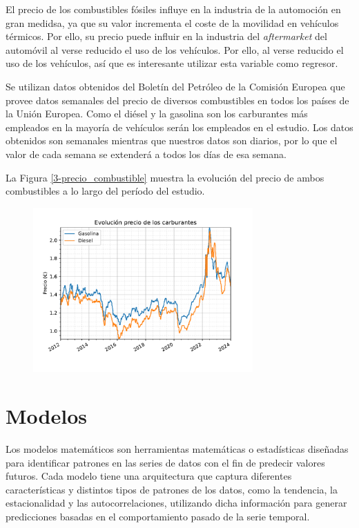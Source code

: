 El precio de los combustibles fósiles influye en la industria de la automoción en gran medidsa, ya que su valor incrementa el coste de la movilidad en vehículos térmicos. Por ello, su precio puede influir en la industria del \textit{aftermarket} del automóvil al verse reducido el uso de los vehículos. Por ello, al verse reducido el uso de los vehículos, así que es interesante utilizar esta variable como regresor.

Se utilizan datos obtenidos del Boletín del Petróleo de la Comisión Europea \cite{petrol} que provee datos semanales del precio de diversos combustibles en todos los países de la Unión Europea. Como el diésel y la gasolina son los carburantes más empleados en la mayoría de vehículos serán los empleados en el estudio. Los datos obtenidos son semanales mientras que nuestros datos son diarios, por lo que el valor de cada semana se extenderá a todos los días de esa semana. 

La Figura \ref*{3-precio_combustible} muestra la evolución del precio de ambos combustibles a lo largo del período del estudio.

\begin{figure}[H]
	{\includegraphics[width=0.75\textwidth]{imagenes/grafica_carburantes.pdf}}
\end{figure}

\section{Modelos}

Los modelos matemáticos son herramientas matemáticas o estadísticas diseñadas para identificar patrones en las series de datos con el fin de predecir valores futuros. Cada modelo tiene una arquitectura que captura diferentes características y distintos tipos de patrones de los datos, como la tendencia, la estacionalidad y las autocorrelaciones, utilizando dicha información para generar predicciones basadas en el comportamiento pasado de la serie temporal.

